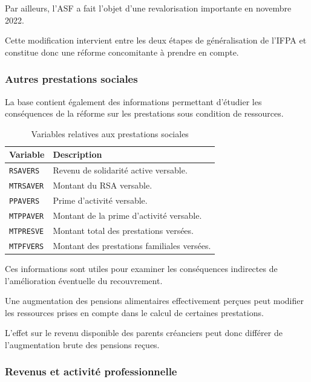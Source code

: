 \documentclass[11pt,a4paper]{article}
\begin{document}
Par ailleurs, l'ASF a fait
l'objet d'une revalorisation
importante en novembre 2022.

Cette modification intervient
entre les deux étapes de
généralisation de l'IFPA
et constitue donc une réforme
concomitante à prendre en compte.

\subsubsection{Autres prestations sociales}

La base contient également
des informations permettant
d'étudier les conséquences
de la réforme sur les prestations
sous condition de ressources.

\begin{table}[H]
\centering
\caption{Variables relatives aux prestations sociales}
\small
\begin{tabular}{p{2.4cm}p{10.6cm}}
\toprule
\textbf{Variable} & \textbf{Description} \\
\midrule
\texttt{RSAVERS} &
Revenu de solidarité active versable. \\

\texttt{MTRSAVER} &
Montant du RSA versable. \\

\texttt{PPAVERS} &
Prime d'activité versable. \\

\texttt{MTPPAVER} &
Montant de la prime d'activité versable. \\

\texttt{MTPRESVE} &
Montant total des prestations versées. \\

\texttt{MTPFVERS} &
Montant des prestations familiales versées. \\
\bottomrule
\end{tabular}
\end{table}

Ces informations sont utiles
pour examiner les conséquences
indirectes de l'amélioration
éventuelle du recouvrement.

Une augmentation des pensions
alimentaires effectivement perçues
peut modifier les ressources
prises en compte dans le calcul
de certaines prestations.

L'effet sur le revenu disponible
des parents créanciers peut donc
différer de l'augmentation brute
des pensions reçues.

\subsubsection{Revenus et activité professionnelle}
\end{document}

